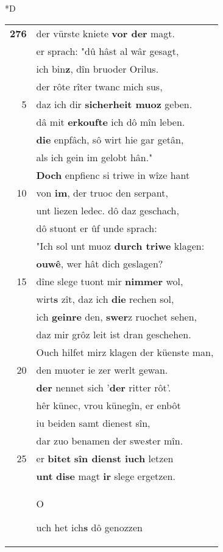 \documentclass[8pt,a4paper,notitlepage]{article}
\begin{document}
\begin{table}[ht]
\begin{minipage}[t]{0.5\linewidth}
\small
\begin{center}*D
\end{center}
\begin{tabular}{rl}
\textbf{276} & der vürste kniete \textbf{vor der} magt.\\ 
 & er sprach: "dû hâst al wâr gesagt,\\ 
 & ich bin\textbf{z}, dîn bruoder Orilus.\\ 
 & der rôte rîter twanc mich sus,\\ 
5 & daz ich dir \textbf{sicherheit muoz} geben.\\ 
 & dâ mit \textbf{erkoufte} ich dô mîn leben.\\ 
 & \textbf{die} enpfâch, sô wirt hie gar getân,\\ 
 & als ich gein im gelobt hân."\\ 
 & \textbf{Doch} enpfienc si triwe in wîze hant\\ 
10 & von \textbf{im}, der truoc den serpant,\\ 
 & unt liezen ledec. dô daz geschach,\\ 
 & dô stuont er ûf unde sprach:\\ 
 & "Ich sol unt muoz \textbf{durch triwe} klagen:\\ 
 & \textbf{ouwê}, wer hât dich geslagen?\\ 
15 & dîne slege tuont mir \textbf{nimmer} wol,\\ 
 & wirt\textbf{s} zît, daz ich \textbf{die} rechen sol,\\ 
 & ich \textbf{geinre} den, \textbf{swer}z ruochet sehen,\\ 
 & daz mir grôz leit ist dran geschehen.\\ 
 & Ouch hilfet mirz klagen der küenste man,\\ 
20 & den muoter ie zer werlt gewan.\\ 
 & \textbf{der} nennet sich '\textbf{der} ritter rôt'.\\ 
 & hêr künec, vrou künegîn, er enbôt\\ 
 & iu beiden samt dienest sîn,\\ 
 & dar zuo benamen der swe\textit{s}ter mîn.\\ 
25 & er \textbf{bitet} \textbf{sîn dienst iuch} letzen\\ 
 & \textbf{unt} \textbf{dise} magt \textbf{ir} slege ergetzen.\\ 
 & \begin{large}O\end{large}uch het ich\textbf{s} dô genozzen\\ 

\end{tabular}
\end{minipage}
\end{table}
\end{document}
